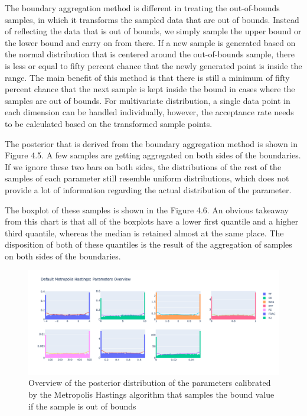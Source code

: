 The boundary aggregation method is different in treating the out-of-bounds samples, in which it transforms the sampled data that are out of bounds. Instead of reflecting the data that is out of bounds, we simply sample the upper bound or the lower bound and carry on from there. If a new sample is generated based on the normal distribution that is centered around the out-of-bounds sample, there is less or equal to fifty percent chance that the newly generated point is inside the range.\cite{gaussian_distribution_property} The main benefit of this method is that there is still a minimum of fifty percent chance that the next sample is kept inside the bound in cases where the samples are out of bounds. For multivariate distribution, a single data point in each dimension can be handled individually, however, the acceptance rate needs to be calculated based on the transformed sample points. 

The posterior that is derived from the boundary aggregation method is shown in Figure 4.5.  A few samples are getting aggregated on both sides of the boundaries. If we ignore these two bars on both sides, the distributions of the rest of the samples of each parameter still resemble uniform distributions, which does not provide a lot of information regarding the actual distribution of the parameter. 

The boxplot of these samples is shown in the Figure 4.6. An obvious takeaway from this chart is that all of the boxplots have a lower first quantile and a higher third quantile, whereas the median is retained almost at the same place. The disposition of both of these quantiles is the result of the aggregation of samples on both sides of the boundaries.


\begin{figure}[H]
    \centering
    \includegraphics[width=1\textwidth]{figures/basic_mh/aggr_mh/aggr_mh_parameters_overview.png}
    \captionsetup{width=.8\textwidth}
    \caption{Overview of the posterior distribution of the parameters calibrated by the Metropolis Hastings algorithm that samples the bound value if the sample is out of bounds}
    \label{fig:enter-label}
\end{figure}

